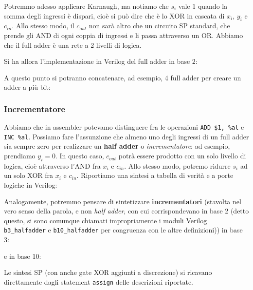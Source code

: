 \documentclass[a4paper,11pt]{article}
\begin{document}
Potremmo adesso applicare Karnaugh, ma notiamo che $s_i$ vale 1 quando la somma degli ingressi è dispari, cioè si può dire che è lo XOR in cascata di $x_i$, $y_i$ e $c_{in}$. 
Allo stesso modo, il $c_{out}$ non sarà altro che un circuito SP standard, che prende gli AND di ogni coppia di ingressi e li passa attraverso un OR.
Abbiamo che il full adder è una rete a 2 livelli di logica.

Si ha allora l'implementazione in Verilog del full adder in base 2:



A questo punto si potranno concatenare, ad esempio, 4 full adder per creare un adder a più bit:



\subsubsection{Incrementatore}
Abbiamo che in assembler potevamo distinguere fra le operazioni \lstinline|ADD $1, %al| e \lstinline|INC %al|.
Possiamo fare l'assunzione che almeno uno degli ingressi di un full adder sia sempre zero per realizzare un \textbf{half adder} o \textit{incrementatore}: ad esempio, prendiamo $y_i = 0$. 
In questo caso, $c_{out}$ potrà essere prodotto con un solo livello di logica, cioè attraverso l'AND fra $x_i$ e $c_{in}$.
Allo stesso modo, potremo ridurre $s_i$ ad un solo XOR fra $x_i$ e $c_{in}$.
Riportiamo una sintesi a tabella di verità e a porte logiche in Verilog:



Analogamente, potremmo pensare di sintetizzare \textbf{incrementatori} (stavolta nel vero senso della parola, e non \textit{half adder}, con cui corrispondevano in base 2 (detto questo, si sono comunque chiamati impropriamente i moduli Verilog \lstinline|b3_halfadder| e \lstinline|b10_halfadder| per congruenza con le altre definizioni)) in base 3: 



e in base 10: 



Le sintesi SP (con anche gate XOR aggiunti a discrezione) si ricavano direttamente dagli statement \lstinline|assign| delle descrizioni riportate.
\end{document}
